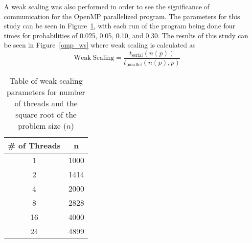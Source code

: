 \documentclass[11pt]{article}
\begin{document}
\noindent A weak scaling was also performed in order to see the significance of communication for the OpenMP parallelized program. The parameters for this study can be seen in Figure~\ref{mpi_ws_tab}, with each run of the program being done four times for probabilities of 0.025, 0.05, 0.10, and 0.30. The results of this study can be seen in Figure~\ref{omp_ws} where weak scaling is calculated as
\begin{equation}
\mathrm{Weak \; Scaling} = \frac{t_{\mathrm{serial}}(n(p))}{t_{\mathrm{parallel}}(n(p),p)}
\label{ws}
\end{equation}
\begin{table}[h]
	\begin{center}
		\begin{tabular}{|c| c|}
			\hline
			\# of Threads & n \\ \hline
			1 & 1000 \\ \hline
			2 & 1414 \\ \hline
			4 & 2000 \\ \hline
			8 & 2828 \\ \hline
			16 & 4000 \\ \hline
			24 & 4899 \\ \hline
		\end{tabular}
	\end{center}
	\caption{Table of weak scaling parameters for number of threads and the square root of the problem size ($n$)}
	\label{mpi_ws_tab}
\end{table}
\end{document}
